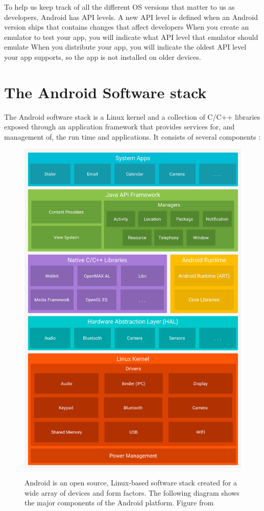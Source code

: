 To help us keep track of all the different OS versions that matter to us as developers, Android has API levels.
A new API level is defined when an Android version ships that contains changes that affect developers
When you create an emulator to test your app, you will indicate what API level that emulator should emulate
When you distribute your app, you will indicate the oldest API level your app supports, so the app is not installed on older devices.

\section{The Android Software stack}
The Android software stack is a Linux kernel and a collection of C/C++ libraries exposed through an application framework that provides services for, and management of, the run time and applications.
It consists of several components \cite{Google2017}:

\begin{figure}[t]
	\centering
	\includegraphics[width=\textwidth]{images/hello/android-stack.png}
	\label{fig:stack}
	\caption{Android is an open source, Linux-based software stack created for a wide array of devices and form factors.
			The following diagram shows the major components of the Android platform. Figure from \cite{Google2017}}
\end{figure}

